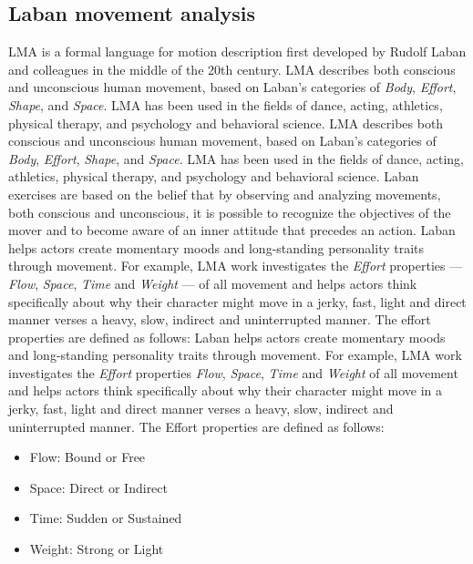 \documentclass[11pt,twocolumn,varwidth=true,a4paper,fleqn]{article}
\begin{document}
\subsection{Laban movement analysis}
LMA is a formal language for motion description first developed by Rudolf Laban \cite{Laban} and colleagues in the middle of the 20th century. LMA describes both conscious and unconscious human movement, based on Laban's categories of \textit{Body}, \textit{Effort}, \textit{Shape}, and \textit{Space}. LMA has been used in the fields of dance, acting, athletics, physical therapy, and psychology and behavioral science.
LMA describes both conscious and unconscious human movement, based on Laban's categories of \textit{Body}, \textit{Effort}, \textit{Shape}, and \textit{Space}. LMA has been used in the fields of dance, 
acting, athletics, physical therapy, and psychology and behavioral science. Laban exercises are based on the belief that by observing and analyzing movements, both conscious and unconscious, it is possible to recognize the objectives of the mover and to become aware of an inner attitude that precedes an action. Laban 
helps actors create momentary moods and long-standing personality traits 
through movement. For example, LMA work investigates the \textit{Effort} properties ---
\textit{Flow}, \textit{Space}, \textit{Time} and \textit{Weight} --- of all movement and helps actors think
specifically about why their character might move in a jerky, fast, light and direct manner
verses a heavy, slow, indirect and uninterrupted manner.
The effort properties are defined as follows:
Laban helps actors create momentary moods and long-standing personality traits through movement. For example, LMA work investigates the \textit{Effort} properties \textit{Flow}, \textit{Space}, \textit{Time} and \textit{Weight} of all movement and helps actors think specifically about why their character might move in a jerky, fast, light and direct manner verses a heavy, slow, indirect and uninterrupted manner. The Effort properties are defined as follows:
\begin{itemize}
\item
Flow: Bound or Free 
\item
Space: Direct or Indirect 
\item
Time: Sudden or Sustained 
\item
Weight: Strong or Light 
\end{itemize}
\end{document}
